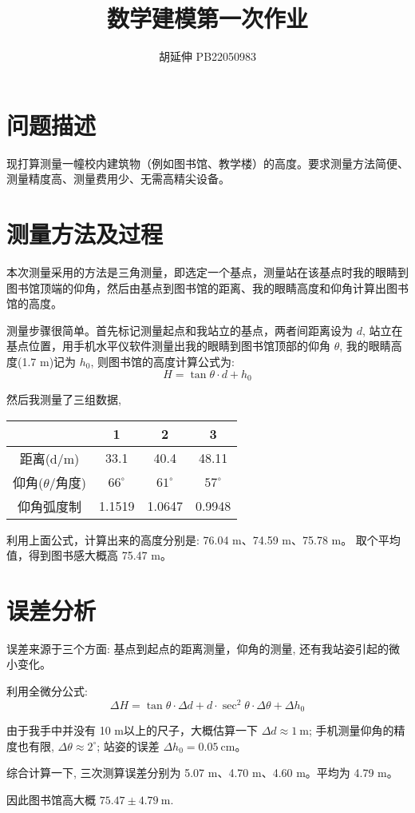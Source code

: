 \documentclass{article}
\title{数学建模第一次作业}
\author{胡延伸 PB22050983}
\begin{document}
\maketitle
\section{问题描述}
现打算测量一幢校内建筑物（例如图书馆、教学楼）的高度。要求测量方法简便、测量精度高、测量费用少、无需高精尖设备。
\section{测量方法及过程}
本次测量采用的方法是三角测量，即选定一个基点，测量站在该基点时我的眼睛到图书馆顶端的仰角，然后由基点到图书馆的距离、我的眼睛高度和仰角计算出图书馆的高度。

测量步骤很简单。首先标记测量起点和我站立的基点，两者间距离设为 $d$, 站立在基点位置，用手机水平仪软件测量出我的眼睛到图书馆顶部的仰角 $\theta$, 我的眼睛高度(1.7 m)记为 $h_0$, 则图书馆的高度计算公式为:\[H = \tan{\theta} \cdot d + h_0\]

然后我测量了三组数据,
\begin{table}[H]
    \centering
    \begin{tabular}{|c|c|c|c|}
        \hline
        &   1           &   2           &   3 \\
        \hline
    距离(d/m) &  33.1        &   40.4        &   48.11\\
    \hline
    仰角($\theta$/角度) &  $66^\circ$  &  $61^\circ$   &   $57^{\circ}$\\
    \hline
    仰角弧度制 & 1.1519 & 1.0647    &   0.9948 \\
    \hline
\end{tabular}
\end{table}

利用上面公式，计算出来的高度分别是: 76.04 m、74.59 m、75.78 m。 取个平均值，得到图书感大概高 75.47 m。 

\section{误差分析}
误差来源于三个方面: 基点到起点的距离测量，仰角的测量, 还有我站姿引起的微小变化。

利用全微分公式:\[\Delta{H} = \tan{\theta} \cdot \Delta{d} + d \cdot \sec^2{\theta}\cdot \Delta{\theta} + \Delta{h_0}\]

由于我手中并没有 10 m以上的尺子，大概估算一下 $\Delta d \approx 1\ \text{m}$; 手机测量仰角的精度也有限, $\Delta{\theta} \approx 2^{\circ}$; 站姿的误差 $\Delta{h_0} = 0.05\ \text{cm}$。

综合计算一下, 三次测算误差分别为 5.07 m、4.70 m、4.60 m。平均为 4.79 m。

因此图书馆高大概 $75.47\pm 4.79\ \text{m}$.
\end{document}
